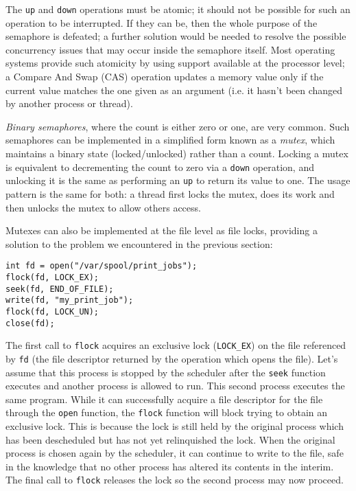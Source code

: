 The \texttt{up} and \texttt{down} operations must be atomic; it should
not be possible for such an operation to be interrupted.  If they can
be, then the whole purpose of the semaphore is defeated; a further
solution would be needed to resolve the possible concurrency issues
that may occur inside the semaphore itself.  Most operating systems
provide such atomicity by using support available at the processor
level; a Compare And Swap (CAS) operation updates a memory value only
if the current value matches the one given as an argument (i.e. it
hasn't been changed by another process or thread).

\emph{Binary semaphores}, where the count is either zero or one, are
very common.  Such semaphores can be implemented in a simplified form
known as a \emph{mutex}, which maintains a binary state
(locked/unlocked) rather than a count.  Locking a mutex is equivalent
to decrementing the count to zero via a \texttt{down} operation, and unlocking
it is the same as performing an \texttt{up} to return its value to one.  The
usage pattern is the same for both: a thread first locks the mutex,
does its work and then unlocks the mutex to allow others access.

Mutexes can also be implemented at the file level as file locks,
providing a solution to the problem we encountered in the previous
section:

\begin{verbatim}
int fd = open("/var/spool/print_jobs");
flock(fd, LOCK_EX);
seek(fd, END_OF_FILE);
write(fd, "my_print_job");
flock(fd, LOCK_UN);
close(fd);
\end{verbatim}

The first call to \texttt{flock} acquires an exclusive lock
(\texttt{LOCK\_EX}) on the file referenced by \texttt{fd} (the file
descriptor returned by the operation which opens the file).  Let's
assume that this process is stopped by the scheduler after the
\texttt{seek} function executes and another process is allowed to run.
This second process executes the same program.  While it can
successfully acquire a file descriptor for the file through the
\texttt{open} function, the \texttt{flock} function will block trying
to obtain an exclusive lock.  This is because the lock is still held
by the original process which has been descheduled but has not yet
relinquished the lock.  When the original process is chosen again by
the scheduler, it can continue to write to the file, safe in the
knowledge that no other process has altered its contents in the
interim.  The final call to \texttt{flock} releases the lock so the
second process may now proceed.

